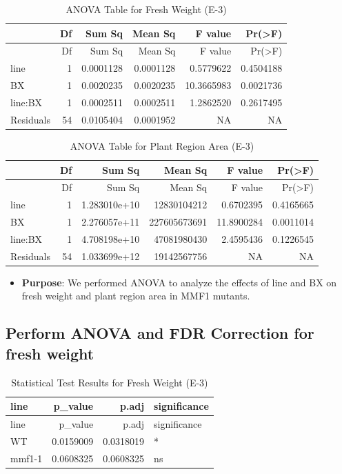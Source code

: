 \documentclass[
  10pt,
]{article}
\providecommand{\tightlist}{%
  \setlength{\itemsep}{0pt}\setlength{\parskip}{0pt}}\usepackage{longtable,booktabs,array}
\begin{document}
\begin{longtable}[]{@{}lrrrrr@{}}
\caption{ANOVA Table for Fresh Weight (E-3)}\tabularnewline
\toprule\noalign{}
& Df & Sum Sq & Mean Sq & F value & Pr(\textgreater F) \\
\midrule\noalign{}
\endfirsthead
\toprule\noalign{}
& Df & Sum Sq & Mean Sq & F value & Pr(\textgreater F) \\
\midrule\noalign{}
\endhead
\bottomrule\noalign{}
\endlastfoot
line & 1 & 0.0001128 & 0.0001128 & 0.5779622 & 0.4504188 \\
BX & 1 & 0.0020235 & 0.0020235 & 10.3665983 & 0.0021736 \\
line:BX & 1 & 0.0002511 & 0.0002511 & 1.2862520 & 0.2617495 \\
Residuals & 54 & 0.0105404 & 0.0001952 & NA & NA \\
\end{longtable}

\begin{longtable}[]{@{}lrrrrr@{}}
\caption{ANOVA Table for Plant Region Area (E-3)}\tabularnewline
\toprule\noalign{}
& Df & Sum Sq & Mean Sq & F value & Pr(\textgreater F) \\
\midrule\noalign{}
\endfirsthead
\toprule\noalign{}
& Df & Sum Sq & Mean Sq & F value & Pr(\textgreater F) \\
\midrule\noalign{}
\endhead
\bottomrule\noalign{}
\endlastfoot
line & 1 & 1.283010e+10 & 12830104212 & 0.6702395 & 0.4165665 \\
BX & 1 & 2.276057e+11 & 227605673691 & 11.8900284 & 0.0011014 \\
line:BX & 1 & 4.708198e+10 & 47081980430 & 2.4595436 & 0.1226545 \\
Residuals & 54 & 1.033699e+12 & 19142567756 & NA & NA \\
\end{longtable}

\begin{itemize}
\tightlist
\item
  \textbf{Purpose}: We performed ANOVA to analyze the effects of line
  and BX on fresh weight and plant region area in MMF1 mutants.
\end{itemize}

\subsection{Perform ANOVA and FDR Correction for fresh
weight}\label{perform-anova-and-fdr-correction-for-fresh-weight}

\begin{longtable}[]{@{}lrrl@{}}
\caption{Statistical Test Results for Fresh Weight (E-3)}\tabularnewline
\toprule\noalign{}
line & p\_value & p.adj & significance \\
\midrule\noalign{}
\endfirsthead
\toprule\noalign{}
line & p\_value & p.adj & significance \\
\midrule\noalign{}
\endhead
\bottomrule\noalign{}
\endlastfoot
WT & 0.0159009 & 0.0318019 & * \\
mmf1-1 & 0.0608325 & 0.0608325 & ns \\
\end{longtable}
\end{document}
